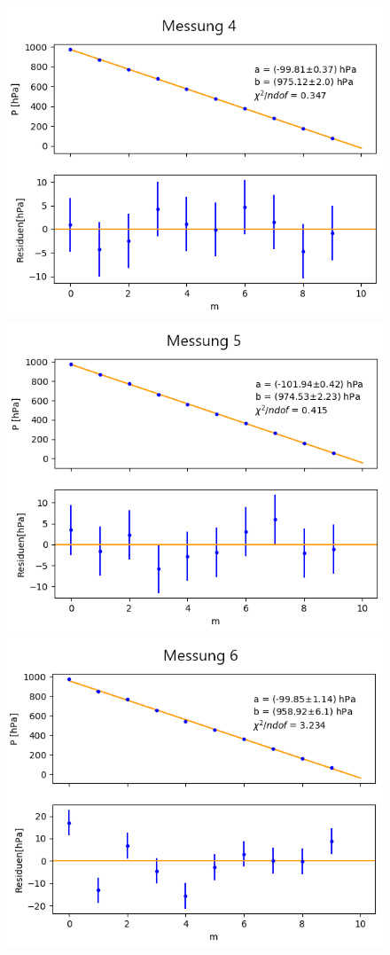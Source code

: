 \documentclass[12pt,a4paper]{article}
\begin{document}
\begin{figure}[H]
\includegraphics[scale=0.5]{Bilder/Druck_A_Var2_4.png}
\includegraphics[scale=0.5]{Bilder/Druck_A_Var2_5.png}
\includegraphics[scale=0.5]{Bilder/Druck_A_Var2_6.png}

\end{figure}
\end{document}
